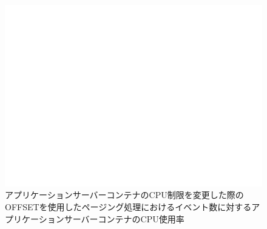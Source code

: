 \documentclass[../../../../../main]{subfiles}
\begin{document}
    \begin{figure}[H]
        \centering
        \includegraphics[width=12cm]{graph}
        \caption{アプリケーションサーバーコンテナのCPU制限を変更した際のOFFSETを使用したページング処理におけるイベント数に対するアプリケーションサーバーコンテナのCPU使用率}
        \label{fig:paging-offset-change-app-cpu-limit-app-cpu-app_1024-db_1_1024}
    \end{figure}
\end{document}
